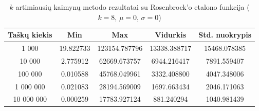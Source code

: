 \begin{table}[H]
    \centering
    \begin{tabular}{|c|c|c|c|c|}
        \hline
        \textbf{Taškų kiekis} & \textbf{Min} & \textbf{Max} & \textbf{Vidurkis} & \textbf{Std. nuokrypis} \\ \hline
        1 000        & 19.822733 & 123154.787796 & 13338.388717 & 15468.078385 \\ \hline
        10 000       & 2.775912 & 62669.673757 & 6944.216417 & 7891.559407 \\ \hline
        100 000      & 0.010588 & 45768.049961 & 3332.408800 & 4047.348006 \\ \hline
        1 000 000    & 0.021083 & 28194.569009 & 1697.663434 & 2046.171063 \\ \hline
        10 000 000   & 0.000259 & 17783.927124 & 881.240294 & 1040.981439 \\ \hline
    \end{tabular}
    \caption{$k$ artimiausių kaimynų metodo rezultatai su Rosenbrock'o etalono funkcija ($k = 8$, $\mu = 0$, $\sigma = 0$)}
\end{table}